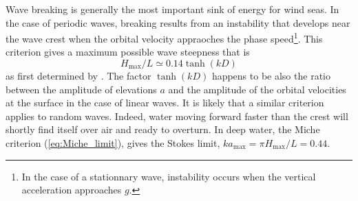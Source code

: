 Wave breaking is generally the most important sink of energy for wind seas. In the case of periodic waves, breaking results from 
an instability that develops near the wave crest when the orbital velocity appraoches the phase speed\footnote{In the case of a stationnary 
wave, instability occurs when the vertical acceleration approaches $g$.}. This criterion gives a maximum possible wave steepness that 
is 
\begin{equation}
H_{\max}/L \simeq 0.14 \label{eq:Miche_limit}
\tanh(kD)    
   \end{equation}
as first determined by \cite{Miche1944d}. 
 The factor $\tanh(kD)$ happens to be also the ratio between the amplitude of elevations $a$ and the amplitude of the orbital velocities at the 
surface in the case of linear waves. It is likely that a similar criterion applies to random waves. Indeed, water moving forward faster than the crest will 
shortly find itself over air and ready to overturn. In deep water, the Miche criterion (\ref{eq:Miche_limit}), gives the Stokes limit, $k a_{\max} = \pi H_{\max}/L = 0.44$. 

